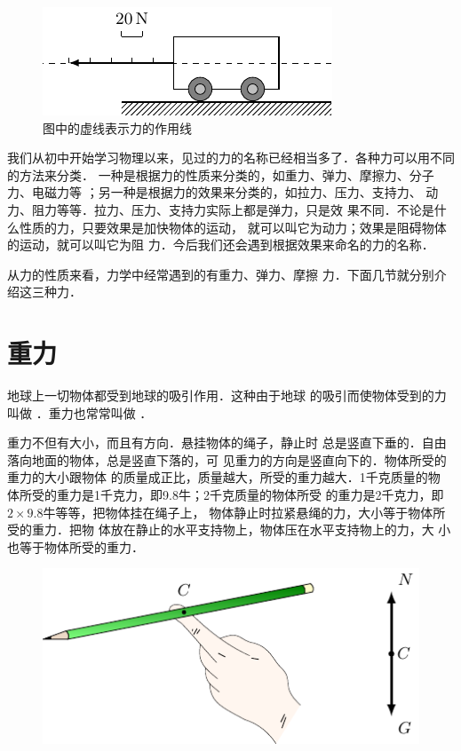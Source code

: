 \begin{figure}[htbp]
    \centering
    \includegraphics{fig/A/1-1.pdf} 
    \caption{图中的虚线表示力的作用线} \label{fig_A_1-1} 
\end{figure} 

我们从初中开始学习物理以来，见过的力的名称已经相当多了．各种力可以用不同的方法来分类．
一种是根据力的性质来分类的，如重力、弹力、摩擦力、分子力、电磁力等
；另一种是根据力的效果来分类的，如拉力、压力、支持力、
动力、阻力等等．拉力、压力、支持力实际上都是弹力，只是效
果不同．不论是什么性质的力，只要效果是加快物体的运动，
就可以叫它为动力；效果是阻碍物体的运动，就可以叫它为阻
力．今后我们还会遇到根据效果来命名的力的名称．

    从力的性质来看，力学中经常遇到的有重力、弹力、摩擦
力．下面几节就分别介绍这三种力．


\section{重力} 
    地球上一切物体都受到地球的吸引作用．这种由于地球
的吸引而使物体受到的力叫做 ．重力也常常叫做 ．

    重力不但有大小，而且有方向．悬挂物体的绳子，静止时
总是竖直下垂的．自由落向地面的物体，总是竖直下落的，可
见重力的方向是竖直向下的．物体所受的重力的大小跟物体
的质量成正比，质量越大，所受的重力越大．1千克质量的物
体所受的重力是1千克力，即9.8牛；2千克质量的物体所受
的重力是2千克力，即$2\times 9.8$牛等等，把物体挂在绳子上，
物体静止时拉紧悬绳的力，大小等于物体所受的重力．把物
体放在静止的水平支持物上，物体压在水平支持物上的力，大
小也等于物体所受的重力．

\begin{figure}[htbp]
    \centering
    \includegraphics{fig/A/1-2.pdf} 
    \caption{} \label{fig_A_1-2} 
\end{figure} 

